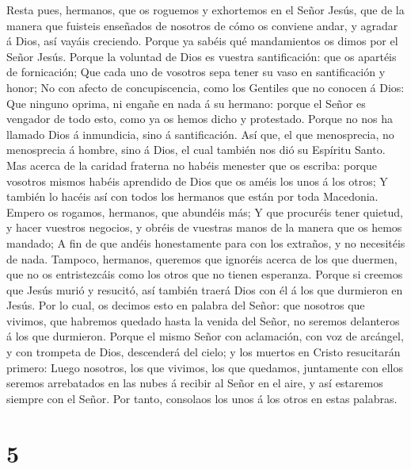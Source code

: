  Resta pues, hermanos, que os roguemos y exhortemos en el
Señor Jesús, que de la manera que fuisteis enseñados de nosotros de cómo
os conviene andar, y agradar á Dios, así vayáis creciendo. 
Porque ya sabéis qué mandamientos os dimos por el Señor Jesús.
 Porque la voluntad de Dios es vuestra santificación: que os
apartéis de fornicación;  Que cada uno de vosotros sepa
tener su vaso en santificación y honor;  No con afecto de
concupiscencia, como los Gentiles que no conocen á Dios: 
Que ninguno oprima, ni engañe en nada á su hermano: porque el Señor es
vengador de todo esto, como ya os hemos dicho y protestado. 
Porque no nos ha llamado Dios á inmundicia, sino á santificación.
 Así que, el que menosprecia, no menosprecia á hombre, sino
á Dios, el cual también nos dió su Espíritu Santo.  Mas
acerca de la caridad fraterna no habéis menester que os escriba: porque
vosotros mismos habéis aprendido de Dios que os améis los unos á los
otros;  Y también lo hacéis así con todos los hermanos que
están por toda Macedonia. Empero os rogamos, hermanos, que abundéis más;
 Y que procuréis tener quietud, y hacer vuestros negocios,
y obréis de vuestras manos de la manera que os hemos mandado;
 A fin de que andéis honestamente para con los extraños, y
no necesitéis de nada.  Tampoco, hermanos, queremos que
ignoréis acerca de los que duermen, que no os entristezcáis como los
otros que no tienen esperanza.  Porque si creemos que Jesús
murió y resucitó, así también traerá Dios con él á los que durmieron en
Jesús.  Por lo cual, os decimos esto en palabra del Señor:
que nosotros que vivimos, que habremos quedado hasta la venida del
Señor, no seremos delanteros á los que durmieron.  Porque
el mismo Señor con aclamación, con voz de arcángel, y con trompeta de
Dios, descenderá del cielo; y los muertos en Cristo resucitarán primero:
 Luego nosotros, los que vivimos, los que quedamos,
juntamente con ellos seremos arrebatados en las nubes á recibir al Señor
en el aire, y así estaremos siempre con el Señor.  Por
tanto, consolaos los unos á los otros en estas palabras.

\hypertarget{section-4}{%
\section{5}\label{section-4}}

